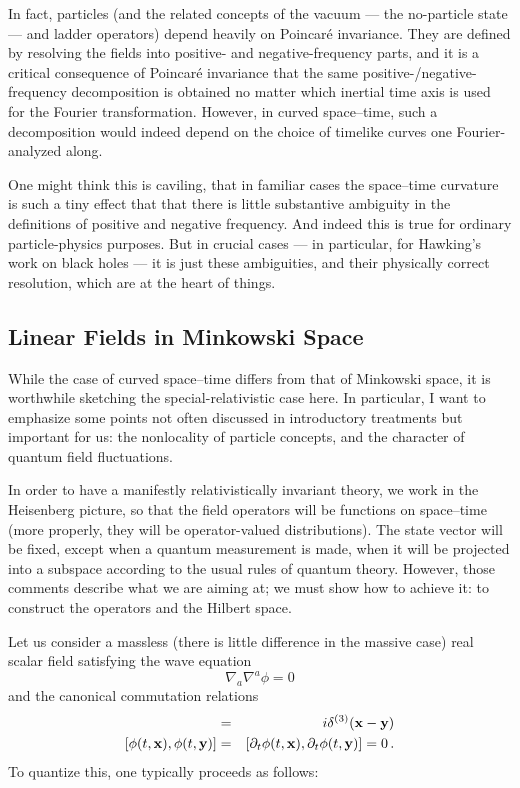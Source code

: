 \documentclass[12pt]{article}
\begin{document}
In fact, particles (and the related concepts of the vacuum --- the no-particle state --- and ladder operators) depend heavily on Poincar\'e invariance.  They are defined by resolving the fields into positive- and negative-frequency parts, and it is a critical consequence of Poincar\'e invariance that the same positive-/negative-frequency decomposition is obtained no matter which inertial time axis is used for the Fourier transformation.  However, in curved space--time, such a decomposition would indeed depend on the choice of timelike curves one Fourier-analyzed along.

One might think this is caviling, that in familiar cases the space--time curvature is such a tiny effect that that there is little substantive ambiguity in the definitions of positive and negative frequency.  And indeed this is true for ordinary particle-physics purposes.  But in crucial cases --- in particular, for Hawking's work on black holes --- it is just these ambiguities, and their physically correct resolution, which are at the heart of things.





\subsection{Linear Fields in Minkowski Space}

While the case of curved space--time differs from that of Minkowski space, it is worthwhile sketching the special-relativistic case here.  In particular, I want to emphasize some points not often discussed in introductory treatments but important for us:  the nonlocality of particle concepts, and the character of quantum field fluctuations.

In order to have a manifestly relativistically invariant theory, we work in the Heisenberg picture, so that the field operators will be functions on space--time (more properly, they will be operator-valued distributions).  The state vector will be fixed, except when a quantum measurement is made, when it will be projected into a subspace according to the usual rules of quantum theory.  However, those comments describe what we are aiming at;  we must show how to achieve it:  to construct the operators and the Hilbert space.

Let us consider a massless (there is little difference in the massive case) real scalar field satisfying the wave equation
\begin{equation}
  \nabla _a\nabla ^a\phi =0
\end{equation}
and the canonical commutation relations
\begin{eqnarray} 
 [\partial _t\phi (t,{\bf x}),\phi (t,{\bf y})] &=&i\delta ^{(3)}({\bf x}-{\bf y})\\
 \left[\phi (t,{\bf x}),\phi (t,{\bf y})\right]&=&
 [\partial _t\phi (t,{\bf x}),\partial _t\phi (t,{\bf y})]=0 \, .
\end{eqnarray}
To quantize this, one typically proceeds as follows:
\end{document}
